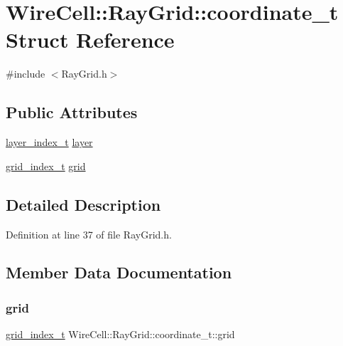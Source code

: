 \hypertarget{struct_wire_cell_1_1_ray_grid_1_1coordinate__t}{}\section{Wire\+Cell\+:\+:Ray\+Grid\+:\+:coordinate\+\_\+t Struct Reference}
\label{struct_wire_cell_1_1_ray_grid_1_1coordinate__t}


{\ttfamily \#include $<$Ray\+Grid.\+h$>$}

\subsection*{Public Attributes}
\begin{DoxyCompactItemize}
\item 
\hyperlink{namespace_wire_cell_1_1_ray_grid_ab7562e54b58eede813d5b70b5eb85812}{layer\+\_\+index\+\_\+t} \hyperlink{struct_wire_cell_1_1_ray_grid_1_1coordinate__t_a909a1153eda352840725de39381fd1d8}{layer}
\item 
\hyperlink{namespace_wire_cell_1_1_ray_grid_ae97b5b26d015cd99f7d4566f3a7310d0}{grid\+\_\+index\+\_\+t} \hyperlink{struct_wire_cell_1_1_ray_grid_1_1coordinate__t_a077e6b21830d8e5de4bf1fbd067caca2}{grid}
\end{DoxyCompactItemize}


\subsection{Detailed Description}


Definition at line 37 of file Ray\+Grid.\+h.



\subsection{Member Data Documentation}
\mbox{\label{struct_wire_cell_1_1_ray_grid_1_1coordinate__t_a077e6b21830d8e5de4bf1fbd067caca2}} 
\subsubsection{\texorpdfstring{grid}{grid}}
{\footnotesize\ttfamily \hyperlink{namespace_wire_cell_1_1_ray_grid_ae97b5b26d015cd99f7d4566f3a7310d0}{grid\+\_\+index\+\_\+t} Wire\+Cell\+::\+Ray\+Grid\+::coordinate\+\_\+t\+::grid}




